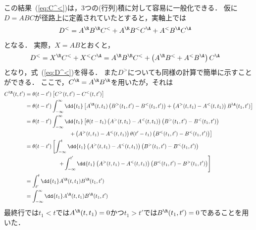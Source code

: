 \documentclass[a4paper,10pt]{jsarticle}
\begin{document}
この結果~(\ref{eq:C^<})は，3つの(行列)積に対して容易に一般化できる．
仮に$D = A B C$が径路上に定義されていたとすると，実軸上では
\begin{align}
D^{<}
	& = A^{\R} B^{\R} C^{<} + A^{\R} B^{<} C^{\A} + A^{<} B^{\A} C^{\A}
\label{eq:D^<}
\end{align}
となる．
実際，$X = A B$とおくと，
\begin{align*}
D^{<}
	& = X^{\R} C^{<} + X^{<} C^{\A}
	= A^{\R} B^{\R} C^{<} + \left( A^{\R} B^{<} + A^{<} B^{\A} \right) C^{\A}
\end{align*}
となり，式~(\ref{eq:D^<})を得る．
また$D^{>}$についても同様の計算で簡単に示すことができる．
ここで，$C^{\R} = A^{\R} B^{\R}$を用いたが，それは
\begin{align}
C^{\R} (t, t')
	& = \theta (t - t') \left[ C^{>} (t, t') - C^{<} (t, t') \right]
\notag \\
	& = \theta (t - t') \int_{-\infty}^{\infty} \dd{t_1} \left[
		A^{\R} (t, t_1) \left( B^{>} (t_1, t') - B^{<} (t_1, t') \right)
		+ \left( A^{>} (t, t_1) - A^{<} (t, t_1) \right) B^{\A} (t_1, t')
	\right]
\notag \\
	& = \theta (t - t') \int_{-\infty}^{\infty} \dd{t_1} \left[
		\theta (t - t_1) \left( A^{>} (t, t_1) - A^{<} (t, t_1) \right) \left( B^{>} (t_1, t') - B^{<} (t_1, t') \right)
\right. \notag \\ & \hspace{8em} \left.
		+ \left( A^{>} (t, t_1) - A^{<} (t, t_1) \right) \theta (t' - t_1) \left( B^{<} (t_1, t') - B^{<} (t_1, t') \right)
	\right]
\notag \\
	& = \theta (t - t') \left[
		\int_{-\infty}^{t} \dd{t_1} \left( A^{>} (t, t_1) - A^{<} (t, t_1) \right) \left( B^{>} (t_1, t') - B^{<} (t_1, t') \right)
\right. \notag \\ & \hspace{6em} \left.
		+ \int_{-\infty}^{t'} \dd{t_1} \left( A^{>} (t, t_1) - A^{<} (t, t_1) \right) \left( B^{<} (t_1, t') - B^{>} (t_1, t') \right)
	\right]
\notag \\
	& = \int_{t'}^{t} \dd{t_1} A^{\R} (t, t_1) B^{\R} (t_1, t')
\\	& = \int_{-\infty}^{\infty} \dd{t_1} A^{\R} (t, t_1) B^{\R} (t_1, t')
\notag
\end{align}
最終行では$t_1 < t$では$A^{\R} (t, t_1) = 0$かつ$t_1 > t'$では$B^{\R} (t_1, t') = 0$であることを用いた．
\end{document}
